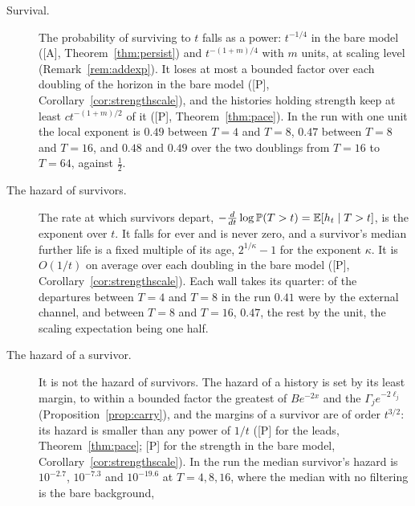 \begin{description}
\item[Survival.] The probability of surviving to $t$ falls as a power:
$t^{-1/4}$ in the bare model ([A], Theorem~\ref{thm:persist}) and $t^{-(1+m)/4}$ with $m$
units, at scaling level (Remark~\ref{rem:addexp}). It loses at most a bounded factor
over each doubling of the horizon in the bare model ([P], Corollary~\ref{cor:strengthscale}),
and the histories holding strength keep at least $ct^{-(1+m)/2}$ of it
([P], Theorem~\ref{thm:pace}). In the run with one unit the local exponent is $0.49$
between $T=4$ and $T=8$, $0.47$ between $T=8$ and $T=16$, and $0.48$ and $0.49$ over the two doublings from $T=16$ to $T=64$, against
$\tfrac12$.
\item[The hazard of survivors.] The rate at which survivors depart,
$-\frac{d}{dt}\log\mathbb{P}(T>t)=\mathbb{E}[h_t\mid T>t]$, is the exponent over $t$. It
falls for ever and is never zero, and a survivor's median further life
is a fixed multiple of its age, $2^{1/\kappa}-1$ for the exponent $\kappa$.
It is $O(1/t)$ on average over each doubling
in the bare model ([P], Corollary~\ref{cor:strengthscale}). Each wall takes its quarter: of the
departures between $T=4$ and $T=8$ in the run $0.41$ were by the
external channel, and between $T=8$ and $T=16$, $0.47$, the rest by
the unit, the scaling expectation being one half.
\item[The hazard of a survivor.] It is not the hazard of survivors. The
hazard of a history is set by its least margin, to within a bounded
factor the greatest of $Be^{-2x}$ and the $\Gamma_je^{-2\ell_j}$
(Proposition~\ref{prop:carry}), and the margins of a survivor are of order $t^{3/2}$: its
hazard is smaller than any power of $1/t$ ([P] for the leads, Theorem~\ref{thm:pace};
[P] for the strength in the bare model, Corollary~\ref{cor:strengthscale}). In the run the
median survivor's hazard is $10^{-2.7}$, $10^{-7.3}$ and $10^{-19.6}$
at $T=4,8,16$, where the median with no filtering is the bare background,

\end{description}
